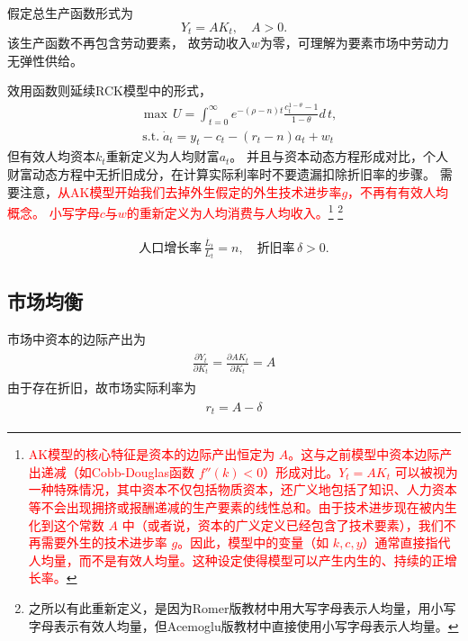 \documentclass[cn,normal,11pt,black]{elegantnote}
\begin{document}
\begin{definition}[生产函数]
    假定总生产函数形式为
    \begin{equation}
        Y_t = A K_t, \quad A > 0.
    \end{equation}
    该生产函数不再包含劳动要素，
    故劳动收入$w$为零，可理解为要素市场中劳动力无弹性供给。
\end{definition}
\begin{definition}[个人效用函数]
    效用函数则延续RCK模型中的形式，
    \begin{align}
        & \max \, U  = \int_{t=0}^{\infty} e^{-(\rho - n)t} \frac{c_t^{1-\theta} -1}{1-\theta}  d \, t, \\
        & \, \mathrm{s.t.} \; \dot{a}_t =  y_t - c_t - (r_t - n)a_t + w_t
    \end{align}
    但有效人均资本$k_t$重新定义为人均财富$a_t$。
    并且与资本动态方程形成对比，个人财富动态方程中无折旧成分，在计算实际利率时不要遗漏扣除折旧率的步骤。
    需要注意，\textcolor{red}{从AK模型开始我们去掉外生假定的外生技术进步率$g$，不再有有效人均概念。
    小写字母$c$与$w$的重新定义为人均消费与人均收入。}\footnote{\textcolor{red}{AK模型的核心特征是资本的边际产出恒定为 $A$。这与之前模型中资本边际产出递减（如Cobb-Douglas函数 $f''(k)<0$）形成对比。$Y_t = AK_t$ 可以被视为一种特殊情况，其中资本不仅包括物质资本，还广义地包括了知识、人力资本等不会出现拥挤或报酬递减的生产要素的线性总和。由于技术进步现在被内生化到这个常数 $A$ 中（或者说，资本的广义定义已经包含了技术要素），我们不再需要外生的技术进步率 $g$。因此，模型中的变量（如 $k, c, y$）通常直接指代人均量，而不是有效人均量。这种设定使得模型可以产生内生的、持续的正增长率。}}
    \footnote{之所以有此重新定义，是因为Romer版教材中用大写字母表示人均量，用小写字母表示有效人均量，但Acemoglu版教材中直接使用小写字母表示人均量。}
\end{definition}
\begin{definition}[投入要素]
    \begin{align}
        \mbox{人口增长率} \, \frac{\dot{L_t}}{L_t} = n, \quad
        \mbox{折旧率} \, \delta > 0.
    \end{align}
\end{definition}

\subsection{市场均衡}

市场中资本的边际产出为
\begin{align}
\begin{aligned}
    \frac{\partial Y_t}{\partial K_t} = \frac{\partial AK_t}{\partial K_t} = A
\end{aligned}
\end{align}
由于存在折旧，故市场实际利率为
\begin{align}\label{AKRamr}
\begin{aligned}
    r_t = A - \delta  
\end{aligned}
\end{align}
\end{document}
